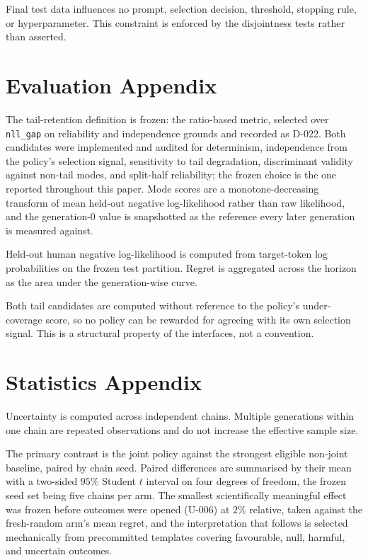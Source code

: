 Final test data influences no prompt, selection decision, threshold, stopping
rule, or hyperparameter. This constraint is enforced by the disjointness tests
rather than asserted.

\section{Evaluation Appendix}
\label{app:evaluation}

The tail-retention definition is frozen: the ratio-based metric, selected over
\texttt{nll\_gap} on reliability and independence grounds and recorded as D-022.
Both candidates were implemented and audited for determinism, independence from the
policy's selection signal, sensitivity to tail degradation, discriminant validity
against non-tail modes, and split-half reliability; the frozen choice is the one
reported throughout this paper. Mode scores are a monotone-decreasing transform of
mean held-out negative log-likelihood rather than raw likelihood, and the
generation-0 value is snapshotted as the reference every later generation is
measured against.

Held-out human negative log-likelihood is computed from target-token log
probabilities on the frozen test partition. Regret is aggregated across the
horizon as the area under the generation-wise curve.

Both tail candidates are computed without reference to the policy's
under-coverage score, so no policy can be rewarded for agreeing with its own
selection signal. This is a structural property of the interfaces, not a
convention.

\section{Statistics Appendix}
\label{app:statistics}

Uncertainty is computed across independent chains. Multiple generations within one
chain are repeated observations and do not increase the effective sample size.

The primary contrast is the joint policy against the strongest eligible non-joint
baseline, paired by chain seed. Paired differences are summarised by their mean
with a two-sided $95\%$ Student $t$ interval on four degrees of freedom, the frozen
seed set being five chains per arm. The smallest scientifically meaningful effect
was frozen before outcomes were opened (U-006) at $2\%$ relative, taken against the
fresh-random arm's mean regret, and the interpretation that follows is selected
mechanically from precommitted templates covering favourable, null, harmful, and
uncertain outcomes.

